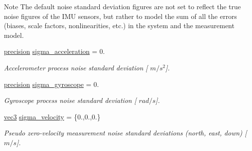 \begin{DoxyNote}{\-Note}
\-The default noise standard deviation figures are not set to reflect the true noise figures of the \-I\-M\-U sensors, but rather to model the sum of all the errors (biases, scale factors, nonlinearities, etc.) in the system and the measurement model. 
\end{DoxyNote}
\begin{DoxyCompactItemize}
\item 
\hyperlink{nav__types_8h_a37e1884b1f06826c49607cec459b4e8a}{precision} \hyperlink{group__nav__eq_ga5add0877d1169e9e1d4dd227c1bcc83d}{sigma\-\_\-acceleration} = 0.
\begin{DoxyCompactList}\small\item\em \-Accelerometer process noise standard deviation \mbox{[} $m/s^2$\mbox{]}. \end{DoxyCompactList}\item 
\hyperlink{nav__types_8h_a37e1884b1f06826c49607cec459b4e8a}{precision} \hyperlink{group__nav__eq_gab6e7cd8a13de230fbcef8ad4e8001eb6}{sigma\-\_\-gyroscope} = 0.
\begin{DoxyCompactList}\small\item\em \-Gyroscope process noise standard deviation \mbox{[} $rad/s$\mbox{]}. \end{DoxyCompactList}\item 
\hyperlink{nav__types_8h_a90c683614d896321009d3b3c401b764f}{vec3} \hyperlink{group__nav__eq_gae79b582d3d0132b84117242e1f6103f3}{sigma\-\_\-velocity} = \{0.,0.,0.\}
\begin{DoxyCompactList}\small\item\em \-Pseudo zero-\/velocity measurement noise standard deviations (north, east, down) \mbox{[} $m/s$\mbox{]}. \end{DoxyCompactList}\end{DoxyCompactItemize}
